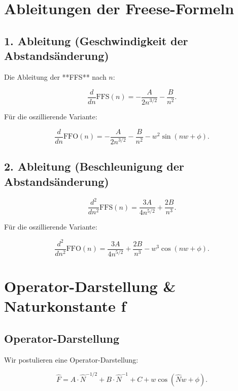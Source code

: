 \documentclass[a4paper,12pt]{article}
\begin{document}
\section{Ableitungen der Freese-Formeln}

\subsection{1. Ableitung (Geschwindigkeit der Abstandsänderung)}
Die Ableitung der **FFS** nach \( n \):

\begin{equation}
    \frac{d}{dn} \text{FFS}(n) = -\frac{A}{2 n^{3/2}} - \frac{B}{n^2}.
\end{equation}

Für die oszillierende Variante:

\begin{equation}
    \frac{d}{dn} \text{FFO}(n) = -\frac{A}{2 n^{3/2}} - \frac{B}{n^2} - w^2 \sin(nw + \phi).
\end{equation}

\subsection{2. Ableitung (Beschleunigung der Abstandsänderung)}
\begin{equation}
    \frac{d^2}{dn^2} \text{FFS}(n) = \frac{3A}{4 n^{5/2}} + \frac{2B}{n^3}.
\end{equation}

Für die oszillierende Variante:

\begin{equation}
    \frac{d^2}{dn^2} \text{FFO}(n) = \frac{3A}{4 n^{5/2}} + \frac{2B}{n^3} - w^3 \cos(nw + \phi).
\end{equation}

\newpage

\section{Operator-Darstellung \& Naturkonstante f}

\subsection{Operator-Darstellung}
Wir postulieren eine Operator-Darstellung:

\begin{equation}
    \hat{F} = A \cdot \hat{N}^{-1/2} + B \cdot \hat{N}^{-1} + C + w \cos(\hat{N} w + \phi).
\end{equation}
\end{document}
